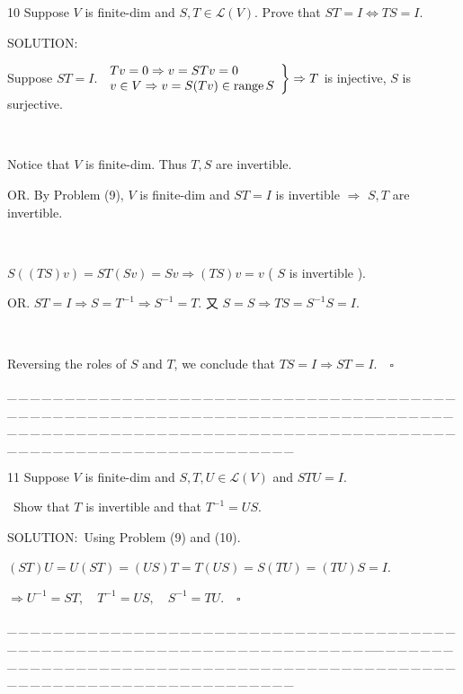 \documentclass[a4paper, 11pt, UTF8]{article}
\def\range{\textup{range}\,}
\def\Lm{\mathcal{L}}
\begin{document}
\begin{large}
{\timesbf\Large 10} {\timessl\Large 
Suppose $V$ is finite-dim and $S,T\in\Lm(V).$ Prove that $ST=I\Longleftrightarrow TS=I.$
}\par
{\timesbf S\footnotesize{OLUTION:}}\par\quad
Suppose $ST=I$. $\left.\begin{array}{l} Tv=0\Rightarrow v=STv=0\\ v\in V\Rightarrow v=S(Tv)\in\range S\end{array}\right\}\Rightarrow T$ is injective, $S$ is surjective.\par{\tiny\,\par}\quad
Notice that $V$ is finite-dim. Thus $T,S$ are invertible.\par\quad
O{\small R. By Problem (9), $V$ is finite-dim and $ST=I$ is invertible $\Rightarrow$ $S,T$ are invertible.}\par{\tiny\,\par}\quad
$S((TS)v)=ST(Sv)=Sv\Rightarrow (TS)v=v$ ( $S$ is invertible ).\par\quad
O{\small R. $ST=I\Rightarrow S=T^{-1}\Rightarrow S^{-1}=T.$ 又 $S=S\Rightarrow TS=S^{-1}S=I$.}\par{\tiny\,\par}\quad
Reversing the roles of $S$ and $T$, we conclude that $TS=I\Rightarrow ST=I.\quad\square$\par
{\tiny \_\,\_\,\_\,\_\,\_\,\_\,\_\,\_\,\_\,\_\,\_\,\_\,\_\,\_\,\_\,\_\,\_\,\_\,\_\,\_\,\_\,\_\,\_\,\_\,\_\,\_\,\_\,\_\,\_\,\_\,\_\,\_\,\_\,\_\,\_\,\_\,\_\,\_\,\_\,\_\,\_\,\_\,\_\,\_\,\_\,\_\,\_\,\_\,\_\,\_\,\_\,\_\,\_\,\_\,\_\,\_\,\_\,\_\,\_\,\_\,\_\,\_\,\_\,\_\,\_\,\_\,\_\,\_\,\_\,\_\,\_\_\,\_\,\_\,\_\,\_\,\_\,\_\,\_\,\_\,\_\,\_\,\_\,\_\,\_\,\_\,\_\,\_\,\_\,\_\,\_\,\_\,\_\,\_\,\_\,\_\,\_\,\_\,\_\,\_\,\_\,\_\,\_\,\_\,\_\,\_\,\_\,\_\,\_\,\_\,\_\,\_\,\_\,\_\,\_\,\_\,\_\,\_\,\_\,\_\,\_\,\_\,\_\,\_\,\_\,\_\,\_\,\_\,\_\,\_\,\_\,\_\,\_\,\_\,\_\,\_\,\_\,\_\,\_\,\_\,\_\,\_\par}

{\timesbf\Large 11} {\timessl\Large 
Suppose $V$ is finite-dim and $S, T, U\in\Lm(V)$ and $STU = I$.}\par\quad\,
{\timessl\Large Show that $T$ is invertible and that $T^{-1} = US$.
}\par
{\timesbf S\footnotesize{OLUTION:}}\,\,\,Using Problem (9) and (10).\par\quad
$(ST)U=U(ST)=(US)T=T(US)=S(TU)=(TU)S=I.$\par\quad
$\Rightarrow U^{-1}=ST,\quad T^{-1}=US,\quad S^{-1}=TU.\quad\square$\par
{\tiny \_\,\_\,\_\,\_\,\_\,\_\,\_\,\_\,\_\,\_\,\_\,\_\,\_\,\_\,\_\,\_\,\_\,\_\,\_\,\_\,\_\,\_\,\_\,\_\,\_\,\_\,\_\,\_\,\_\,\_\,\_\,\_\,\_\,\_\,\_\,\_\,\_\,\_\,\_\,\_\,\_\,\_\,\_\,\_\,\_\,\_\,\_\,\_\,\_\,\_\,\_\,\_\,\_\,\_\,\_\,\_\,\_\,\_\,\_\,\_\,\_\,\_\,\_\,\_\,\_\,\_\,\_\,\_\,\_\,\_\,\_\_\,\_\,\_\,\_\,\_\,\_\,\_\,\_\,\_\,\_\,\_\,\_\,\_\,\_\,\_\,\_\,\_\,\_\,\_\,\_\,\_\,\_\,\_\,\_\,\_\,\_\,\_\,\_\,\_\,\_\,\_\,\_\,\_\,\_\,\_\,\_\,\_\,\_\,\_\,\_\,\_\,\_\,\_\,\_\,\_\,\_\,\_\,\_\,\_\,\_\,\_\,\_\,\_\,\_\,\_\,\_\,\_\,\_\,\_\,\_\,\_\,\_\,\_\,\_\,\_\,\_\,\_\,\_\,\_\,\_\,\_\par}


\end{large}
\end{document}
